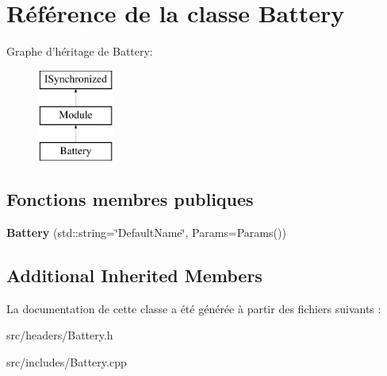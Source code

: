 \hypertarget{classBattery}{\section{Référence de la classe Battery}
\label{classBattery}
}
Graphe d'héritage de Battery\-:\begin{figure}[H]
\begin{center}
\leavevmode
\includegraphics[height=3.000000cm]{classBattery}
\end{center}
\end{figure}
\subsection*{Fonctions membres publiques}
\begin{DoxyCompactItemize}
\item 
\hypertarget{classBattery_a26f76803ff8ed7ce91aec4efe72e0897}{{\bfseries Battery} (std\-::string=\char`\"{}Default\-Name\char`\"{}, Params=Params())}\label{classBattery_a26f76803ff8ed7ce91aec4efe72e0897}

\end{DoxyCompactItemize}
\subsection*{Additional Inherited Members}


La documentation de cette classe a été générée à partir des fichiers suivants \-:\begin{DoxyCompactItemize}
\item 
src/headers/Battery.\-h\item 
src/includes/Battery.\-cpp\end{DoxyCompactItemize}
